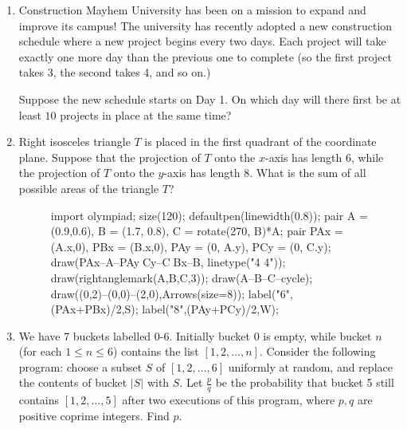 \documentclass[10pt]{article}
\begin{document}
\begin{enumerate}
\setlength{\itemsep}{3pt}


\item Construction Mayhem University has been on a mission to expand and improve
	its campus!  The university has recently adopted a new construction
	schedule where a new project begins every two days. Each project will take exactly one more day than the previous one to complete (so the first project takes 3, the second takes 4, and so on.)

\par Suppose the new schedule starts on Day 1.  On which day will there first be at least $10$ projects in place at the same time?

\item Right isosceles triangle $T$ is placed in the first quadrant of the coordinate plane.  Suppose that the projection of $T$ onto the $x$-axis has length $6$, while the projection of $T$ onto the $y$-axis has length $8$.  What is the sum of all possible areas of the triangle $T$?

\begin{figure}[ht]
	\centering
	\begin{asy}
	import olympiad;
	size(120);
	defaultpen(linewidth(0.8));
	pair A = (0.9,0.6), B = (1.7, 0.8), C = rotate(270, B)*A;
	pair PAx = (A.x,0), PBx = (B.x,0), PAy = (0, A.y), PCy = (0, C.y);
	draw(PAx--A--PAy^^PCy--C^^PBx--B, linetype("4 4"));
	draw(rightanglemark(A,B,C,3));
	draw(A--B--C--cycle);
	draw((0,2)--(0,0)--(2,0),Arrows(size=8));
	label("$6$",(PAx+PBx)/2,S);
	label("$8$",(PAy+PCy)/2,W);
\end{asy}
\end{figure}

\item We have 7 buckets labelled 0-6. Initially bucket 0 is empty, while
	bucket $n$ (for each $1 \leq n \leq 6$) contains the list $[1,2,
	\ldots, n]$. Consider the following program: choose a subset $S$ of
	$[1,2,\ldots,6]$ uniformly at random, and replace the contents of
	bucket $|S|$ with $S$. Let $\frac{p}{q}$ be the probability that bucket
	5 still contains $[1,2, \ldots, 5]$ after two executions of this
	program, where $p,q$ are positive coprime integers. Find $p$. %


\end{enumerate}
\end{document}
